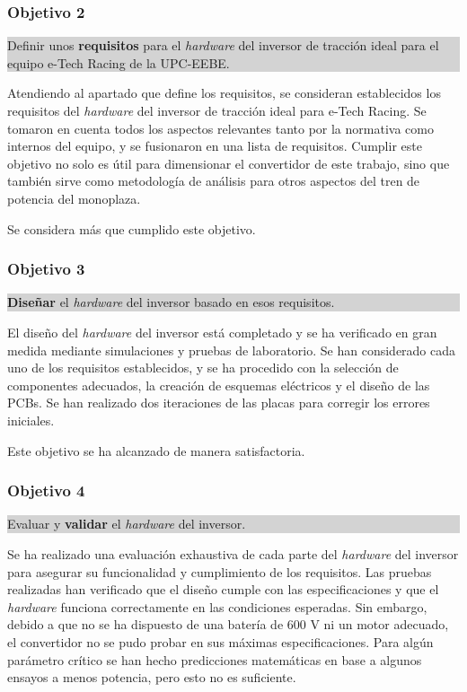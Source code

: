 \subsubsection*{Objetivo 2}
\colorbox{lightgray}{%
	\parbox{\dimexpr\linewidth-2\fboxsep-2\fboxrule}{%
		Definir unos \textbf{requisitos} para el \textit{hardware} del inversor de tracción ideal para el equipo e-Tech Racing de la UPC-EEBE.%
	}%
}

Atendiendo al apartado que define los requisitos, se consideran establecidos los requisitos del \textit{hardware} del inversor de tracción ideal para e-Tech Racing. Se tomaron en cuenta todos los aspectos relevantes tanto por la normativa como internos del equipo, y se fusionaron en una lista de requisitos. Cumplir este objetivo no solo es útil para dimensionar el convertidor de este trabajo, sino que también sirve como metodología de análisis para otros aspectos del tren de potencia del monoplaza. 

Se considera más que cumplido este objetivo.

\subsubsection*{Objetivo 3}
\colorbox{lightgray}{%
	\parbox{\dimexpr\linewidth-2\fboxsep-2\fboxrule}{%
		\textbf{Diseñar} el \textit{hardware} del inversor basado en esos requisitos.%
	}%
}

El diseño del \textit{hardware} del inversor está completado y se ha verificado en gran medida mediante simulaciones y pruebas de laboratorio. Se han considerado cada uno de los requisitos establecidos, y se ha procedido con la selección de componentes adecuados, la creación de esquemas eléctricos y el diseño de las PCBs. Se han realizado dos iteraciones de las placas para corregir los errores iniciales. 

Este objetivo se ha alcanzado de manera satisfactoria.

\subsubsection*{Objetivo 4}
\colorbox{lightgray}{%
	\parbox{\dimexpr\linewidth-2\fboxsep-2\fboxrule}{%
		Evaluar y \textbf{validar} el \textit{hardware} del inversor.%
	}%
}

Se ha realizado una evaluación exhaustiva de cada parte del \textit{hardware} del inversor para asegurar su funcionalidad y cumplimiento de los requisitos. Las pruebas realizadas han verificado que el diseño cumple con las especificaciones y que el \textit{hardware} funciona correctamente en las condiciones esperadas. Sin embargo, debido a que no se ha dispuesto de una batería de 600 V ni un motor adecuado, el convertidor no se pudo probar en sus máximas especificaciones. Para algún parámetro crítico se han hecho predicciones matemáticas en base a algunos ensayos a menos potencia, pero esto no es suficiente.

